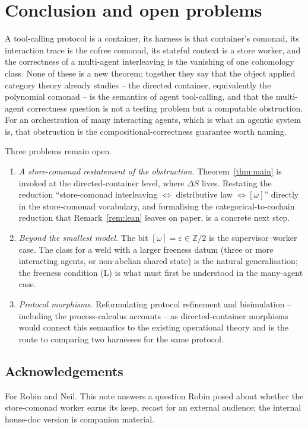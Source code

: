 \documentclass[11pt]{amsart}
\theoremstyle{plain}
\theoremstyle{definition}
\theoremstyle{remark}
\begin{document}
\section{Conclusion and open problems}\label{sec:conclusion}

A tool-calling protocol is a container, its harness is that container's comonad, its interaction
trace is the cofree comonad, its stateful context is a store worker, and the correctness of a
multi-agent interleaving is the vanishing of one cohomology class. None of these is a new theorem;
together they say that the object applied category theory already studies -- the directed container,
equivalently the polynomial comonad -- is the semantics of agent tool-calling, and that the
multi-agent correctness question is not a testing problem but a computable obstruction. For an
orchestration of many interacting agents, which is what an agentic system is, that obstruction is the
compositional-correctness guarantee worth naming.

Three problems remain open.

\begin{enumerate}[leftmargin=1.6em]
\item \emph{A store-comonad restatement of the obstruction.} Theorem~\ref{thm:main} is invoked at the
directed-container level, where $\Delta S$ lives. Restating the reduction ``store-comonad interleaving
$\Leftrightarrow$ distributive law $\Leftrightarrow[\omega]$'' directly in the store-comonad
vocabulary, and formalising the categorical-to-cochain reduction that Remark~\ref{rem:lean} leaves on
paper, is a concrete next step.
\item \emph{Beyond the smallest model.} The bit $[\omega]=\varepsilon\in\mathbb{Z}/2$ is the
supervisor--worker case. The class for a weld with a larger freeness datum (three or more interacting
agents, or non-abelian shared state) is the natural generalisation; the freeness condition (L) is what
must first be understood in the many-agent case.
\item \emph{Protocol morphisms.} Reformulating protocol refinement and bisimulation -- including the
process-calculus accounts -- as directed-container morphisms would connect this semantics to the
existing operational theory and is the route to comparing two harnesses for the same protocol.
\end{enumerate}

\subsection*{Acknowledgements}
For Robin and Neil. This note answers a question Robin posed about whether the store-comonad worker
earns its keep, recast for an external audience; the internal house-doc version is companion material.
\end{document}
